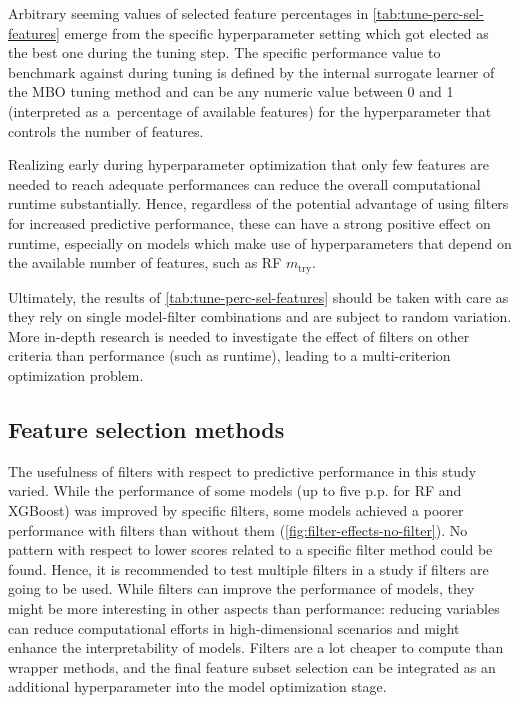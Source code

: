 \documentclass[remotesensing,article,submit,moreauthors,pdftex]{Definitions/mdpi}
\begin{document}
Arbitrary seeming values of selected feature percentages in \autoref{tab:tune-perc-sel-features} emerge from the specific hyperparameter setting which got elected as the best one during the tuning step.
The specific performance value to benchmark against during tuning is defined by the internal surrogate learner of the MBO tuning method and can be any numeric value between 0 and 1 (interpreted as a\ percentage of available features) for the hyperparameter that controls the number of features.

Realizing early during hyperparameter optimization that only few features are needed to reach adequate performances can reduce the overall computational runtime substantially.
Hence, regardless of the potential advantage of using filters for increased predictive performance, these can have a strong positive effect on runtime, especially on models which make use of hyperparameters that depend on the available number of features, such as RF $m_\textrm{try}$.

Ultimately, the results of \autoref{tab:tune-perc-sel-features} should be taken with care as they rely on single model-filter combinations and are subject to random variation.
More in-depth research is needed to investigate the effect of filters on other criteria than performance (such as runtime), leading to a multi-criterion optimization problem.

\subsection{Feature selection methods}

The usefulness of filters with respect to predictive performance in this study varied.
While the performance of some models (up to five p.p. for RF and XGBoost) was improved by specific filters, some models achieved a poorer performance with filters than without them (\autoref{fig:filter-effects-no-filter}).
No pattern with respect to lower scores related to a specific filter method could be found.
Hence, it is recommended to test multiple filters in a study if filters are going to be used.
While filters can improve the performance of models, they might be more interesting in other aspects than performance: reducing variables can reduce computational efforts in high-dimensional scenarios and might enhance the interpretability of models.
Filters are a lot cheaper to compute than wrapper methods, and the final feature subset selection can be integrated as an additional hyperparameter into the model optimization stage.
\end{document}
